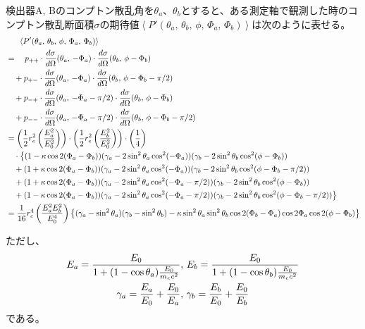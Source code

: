 \documentclass[../../main.tex]{subfiles}
\numberwithin{equation}{section}
\numberwithin{table}{section}
\numberwithin{figure}{section}
\begin{document}
検出器A, Bのコンプトン散乱角を$\theta_a$、$\theta_b$とすると、ある測定軸で観測した時のコンプトン散乱断面積$\sigma$の期待値$\left\langle P' (\theta_a,\, \theta_b,\, \phi,\, \Phi_a,\, \Phi_b) \right\rangle$は次のように表せる。
\begin{align}
  &\phantom{==} \left\langle P' (\theta_a,\, \theta_b,\, \phi,\, \Phi_a,\, \Phi_b) \right\rangle \notag \\ 
  &= \quad p_{++} \cdot \frac{d \sigma}{d \Omega} (\theta_a,\, -\Phi_a) \cdot \frac{d \sigma}{d \Omega} (\theta_b,\, \phi - \Phi_b) \notag \\ 
  &\quad + p_{+-} \cdot \frac{d \sigma}{d \Omega} (\theta_a,\, -\Phi_a) \cdot \frac{d \sigma}{d \Omega} (\theta_b,\, \phi - \Phi_b - \pi/2) \notag \\ 
  &\quad + p_{-+} \cdot \frac{d \sigma}{d \Omega} (\theta_a,\, -\Phi_a - \pi/2) \cdot \frac{d \sigma}{d \Omega} (\theta_b,\, \phi - \Phi_b) \notag \\ 
  &\quad + p_{--} \cdot \frac{d \sigma}{d \Omega} (\theta_a,\, -\Phi_a - \pi/2) \cdot \frac{d \sigma}{d \Omega} (\theta_b,\, \phi - \Phi_b - \pi/2) \notag \\ 
  &= \left(\frac{1}{2} r_e^2 \left( \frac{E_a^2}{E_0^2} \right) \right) \cdot \left(\frac{1}{2} r_e^2 \left( \frac{E_b^2}{E_0^2} \right) \right) \cdot \left( \frac{1}{4} \right) \notag \\
	&\quad \cdot \bigl\{
	(1 - \kappa \cos2(\Phi_a - \Phi_b)) (\gamma_a - 2\sin^2 \theta_a \cos^2 (-\Phi_a)) (\gamma_b - 2\sin^2 \theta_b \cos^2 (\phi - \Phi_b)) \notag \\ 
	&\quad + (1 + \kappa \cos2(\Phi_a - \Phi_b)) (\gamma_a - 2\sin^2 \theta_a \cos^2 (-\Phi_a)) (\gamma_b - 2\sin^2 \theta_b \cos^2 (\phi - \Phi_b - \pi/2)) \notag \\ 
	&\quad + (1 + \kappa \cos2(\Phi_a - \Phi_b)) (\gamma_a - 2\sin^2 \theta_a \cos^2 (-\Phi_a -\pi/2)) (\gamma_b - 2\sin^2 \theta_b \cos^2 (\phi - \Phi_b)) \notag \\ 
	&\quad + (1 - \kappa \cos2(\Phi_a - \Phi_b)) (\gamma_a - 2\sin^2 \theta_a \cos^2 (-\Phi_a -\pi/2)) (\gamma_b - 2\sin^2 \theta_b \cos^2 (\phi - \Phi_b - \pi/2)) 
	\bigr\} \notag \\
  &= \frac{1}{16} r_e^4 \left( \frac{E_a^2 E_b^2}{E_0^4} \right) \bigl\{ (\gamma_a -\sin^2 \theta_a) (\gamma_b -\sin^2 \theta_b) -\kappa \sin^2 \theta_a \sin^2 \theta_b \cos 2(\Phi_b - \Phi_a) \cos 2\Phi_a \cos 2(\phi - \Phi_b) \bigr\}
\end{align}

ただし、
\begin{gather}
	E_a = \frac{E_0}{1 +(1 -\cos\theta_a)\frac{E_0}{m_e c^2}},\, E_b = \frac{E_0}{1 +(1 -\cos\theta_b)\frac{E_0}{m_e c^2}} \notag \\
	\gamma_a = \frac{E_a}{E_0} +\frac{E_0}{E_a},\, \gamma_b = \frac{E_b}{E_0} +\frac{E_0}{E_b}
\end{gather}
である。
\end{document}
